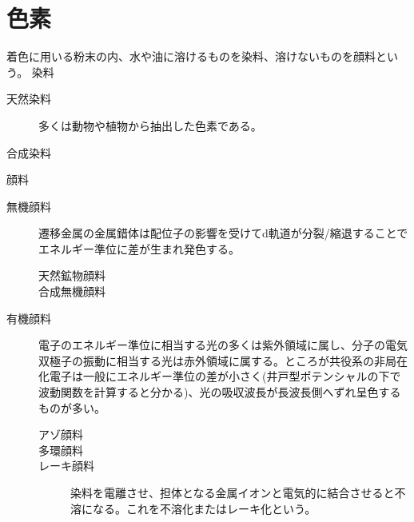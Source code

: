 	\section{色素}
		着色に用いる粉末の内、水や油に溶けるものを染料、溶けないものを顔料という。
		染料
		\begin{description}
			\item[天然染料] 多くは動物や植物から抽出した色素である。
			\item[合成染料]
		\end{description}
		顔料
		\begin{description}
			\item[無機顔料] 遷移金属の金属錯体は配位子の影響を受けてd軌道が分裂/縮退することでエネルギー準位に差が生まれ発色する。
				\begin{description}
					\item[天然鉱物顔料] 
					\item[合成無機顔料] 
				\end{description}
			\item[有機顔料] 電子のエネルギー準位に相当する光の多くは紫外領域に属し、分子の電気双極子の振動に相当する光は赤外領域に属する。ところが共役系の非局在化電子は一般にエネルギー準位の差が小さく(井戸型ポテンシャルの下で波動関数を計算すると分かる)、光の吸収波長が長波長側へずれ呈色するものが多い。
				\begin{description}
					\item[アゾ顔料] 
					\item[多環顔料] 
					\item[レーキ顔料] 染料を電離させ、担体となる金属イオンと電気的に結合させると不溶になる。これを不溶化またはレーキ化という。
				\end{description}
		\end{description}
